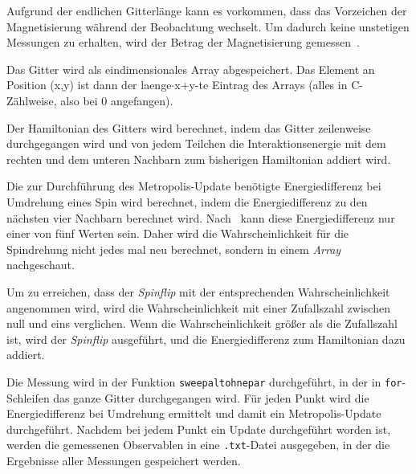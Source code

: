 	Aufgrund der endlichen Gitterlänge kann es vorkommen, dass das Vorzeichen der Magnetisierung während der Beobachtung wechselt. Um dadurch keine unstetigen Messungen zu erhalten, wird der Betrag der Magnetisierung gemessen~\cite[vgl. ][S. 106 ff.]{binderheermann}.%
	
	
	Das Gitter wird als eindimensionales Array abgespeichert. Das Element an Position (x,y) ist dann der laenge$\cdot$x+y-te Eintrag des Arrays (alles in C-Zählweise, also bei 0 angefangen).

	Der Hamiltonian des Gitters wird berechnet, indem das Gitter zeilenweise durchgegangen wird und von jedem Teilchen die Interaktionsenergie mit dem rechten und dem unteren Nachbarn zum bisherigen Hamiltonian addiert wird.
	
	Die zur Durchführung des Metropolis-Update benötigte Energiedifferenz bei Umdrehung eines Spin wird berechnet, indem die Energiedifferenz zu den nächsten vier Nachbarn berechnet wird. 
	Nach~\cite[S. 103]{binderheermann} kann diese Energiedifferenz nur einer von fünf Werten sein. Daher wird die Wahrscheinlichkeit für die Spindrehung nicht jedes mal neu berechnet, sondern in einem \textit{Array} nachgeschaut.
	
	Um zu erreichen, dass der \textit{Spinflip} mit der entsprechenden Wahrscheinlichkeit angenommen wird, wird die Wahrscheinlichkeit mit einer Zufallszahl zwischen null und eins verglichen\cite[nach][]{metropolisupdate}. Wenn die Wahrscheinlichkeit größer als die Zufallszahl ist, wird der \textit{Spinflip} ausgeführt, und die Energiedifferenz zum Hamiltonian dazu addiert. 
	
	Die Messung wird in der Funktion \texttt{sweepaltohnepar} durchgeführt, in der in \texttt{for}-Schleifen das ganze Gitter durchgegangen wird. Für jeden Punkt wird die Energiedifferenz bei Umdrehung ermittelt und damit ein Metropolis-Update durchgeführt. Nachdem bei jedem Punkt ein Update durchgeführt worden ist, werden die gemessenen Observablen in eine \texttt{.txt}-Datei ausgegeben, in der die Ergebnisse aller Messungen gespeichert werden.
	
